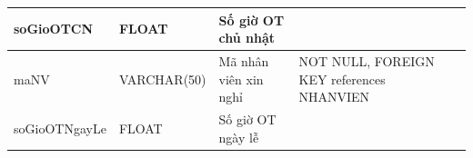 \documentclass[a4paper,12pt]{report}
\begin{document}
\begin{center}
\begin{longtable}{|>{\centering\arraybackslash}p{4.5cm}|
        >{\centering\arraybackslash}p{3.5cm}|
        >{\centering\arraybackslash}p{3.5cm}|
        >{\centering\arraybackslash}p{4cm}|}
        \hline
        soGioOTCN &  FLOAT  & Số giờ OT chủ nhật & \\                                                                                                                          
        \hline
        maNV &  VARCHAR(50)  & Mã nhân viên xin nghỉ & NOT NULL, FOREIGN KEY references NHANVIEN \\                                                                                                                          
        \hline
        soGioOTNgayLe &  FLOAT  & Số giờ OT ngày lễ & \\                                                                                                                          
        \hline
    \end{longtable}
\end{center}
\newpage
\end{document}
